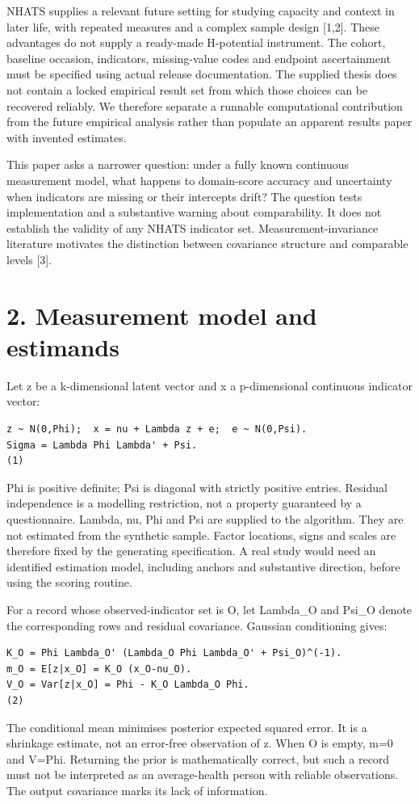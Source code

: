 \documentclass[11pt,a4paper]{article}
\begin{document}
NHATS supplies a relevant future setting for studying capacity and context in later life, with repeated measures and a complex sample design [1,2]. These advantages do not supply a ready-made H-potential instrument. The cohort, baseline occasion, indicators, missing-value codes and endpoint ascertainment must be specified using actual release documentation. The supplied thesis does not contain a locked empirical result set from which those choices can be recovered reliably. We therefore separate a runnable computational contribution from the future empirical analysis rather than populate an apparent results paper with invented estimates.

This paper asks a narrower question: under a fully known continuous measurement model, what happens to domain-score accuracy and uncertainty when indicators are missing or their intercepts drift? The question tests implementation and a substantive warning about comparability. It does not establish the validity of any NHATS indicator set. Measurement-invariance literature motivates the distinction between covariance structure and comparable levels [3].

\section*{2. Measurement model and estimands}
Let z be a k-dimensional latent vector and x a p-dimensional continuous indicator vector:

{\footnotesize\begin{verbatim}
z ~ N(0,Phi);  x = nu + Lambda z + e;  e ~ N(0,Psi).
Sigma = Lambda Phi Lambda' + Psi.                                    (1)
\end{verbatim}}
Phi is positive definite; Psi is diagonal with strictly positive entries. Residual independence is a modelling restriction, not a property guaranteed by a questionnaire. Lambda, nu, Phi and Psi are supplied to the algorithm. They are not estimated from the synthetic sample. Factor locations, signs and scales are therefore fixed by the generating specification. A real study would need an identified estimation model, including anchors and substantive direction, before using the scoring routine.

For a record whose observed-indicator set is O, let Lambda\_O and Psi\_O denote the corresponding rows and residual covariance. Gaussian conditioning gives:

{\footnotesize\begin{verbatim}
K_O = Phi Lambda_O' (Lambda_O Phi Lambda_O' + Psi_O)^(-1).
m_O = E[z|x_O] = K_O (x_O-nu_O).
V_O = Var[z|x_O] = Phi - K_O Lambda_O Phi.                             (2)
\end{verbatim}}
The conditional mean minimises posterior expected squared error. It is a shrinkage estimate, not an error-free observation of z. When O is empty, m=0 and V=Phi. Returning the prior is mathematically correct, but such a record must not be interpreted as an average-health person with reliable observations. The output covariance marks its lack of information.
\end{document}
